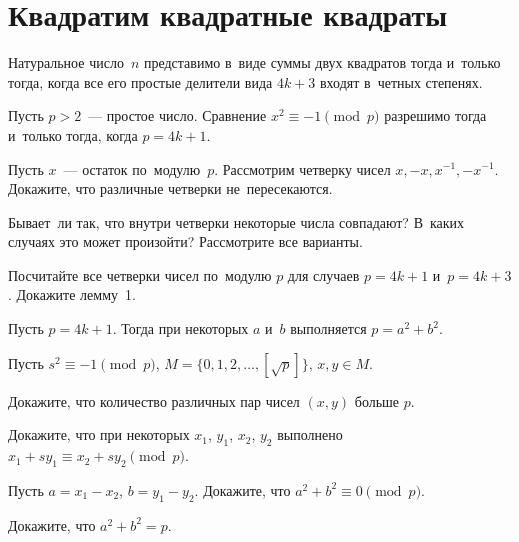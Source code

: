 
\section*{Квадратим квадратные квадраты}

\begingroup
    \def\abs#1{\lvert #1 \rvert}%
    \def\divides{\mathrel{\vert}}%
    \def\imag{\mathrm{i}}%

\theorem
Натуральное число~$n$ представимо в~виде суммы двух квадратов тогда и~только
тогда, когда все его простые делители вида $4k + 3$ входят в~четных степенях.

Пусть $p > 2$~--- простое число.
Сравнение $x^2 \equiv -1 \pmod{p}$ разрешимо тогда и~только тогда, когда
$p = 4k + 1$.

\begin{problems}

\item
Пусть $x$~--- остаток по~модулю~$p$.
Рассмотрим четверку чисел $x, -x, x^{-1}, -x^{-1}$.
Докажите, что различные четверки не~пересекаются.

\item
Бывает~ли так, что внутри четверки некоторые числа совпадают?
В~каких случаях это может произойти?
Рассмотрите все варианты.

\item
Посчитайте все четверки чисел по~модулю $p$ для случаев $p = 4 k + 1$
и~$p = 4 k + 3$.
Докажите лемму~1.

\end{problems}

Пусть $p = 4 k + 1$.
Тогда при некоторых $a$ и~$b$ выполняется $p = a^2 + b^2$.

Пусть $s^2 \equiv -1 \pmod{p}$, $M = \{ 0, 1, 2, \ldots, [\sqrt{p}] \}$,
$x, y \in M$.

\begin{problems}

\item
Докажите, что количество различных пар чисел $(x, y)$ больше $p$.

\item
Докажите, что при некоторых $x_1$, $y_1$, $x_2$, $y_2$ выполнено
$x_1 + s y_1 \equiv x_2 + s y_2 \pmod{p}$.

\item
Пусть $a = x_1 - x_2$, $b = y_1 - y_2$.
Докажите, что $a^2 + b^2 \equiv 0 \pmod p$.

\item
Докажите, что $a^2 + b^2 = p$.

\end{problems}

